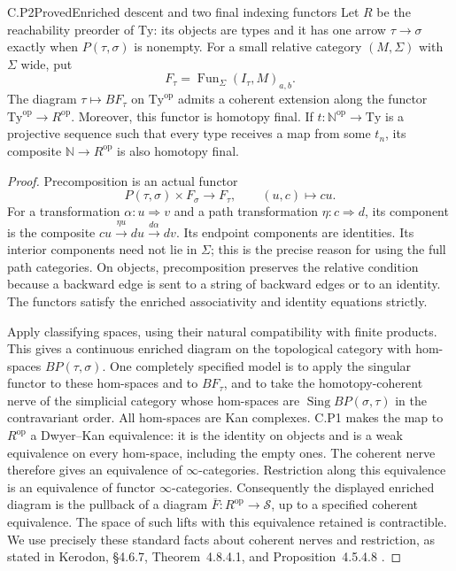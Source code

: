 \begin{result}{C.P2}{Proved}{Enriched descent and two final indexing functors}
Let $R$ be the reachability preorder of $\mathrm{Ty}$: its objects are types and it has one arrow $\tau\to\sigma$ exactly when $P(\tau,\sigma)$ is nonempty. For a small relative category $(M,\Sigma)$ with $\Sigma$ wide, put
\[
 F_\tau=\operatorname{Fun}_{\Sigma}(I_\tau,M)_{a,b}.
\]
The diagram $\tau\mapsto BF_\tau$ on $\mathrm{Ty}^{\mathrm{op}}$ admits a coherent extension along the functor
$\mathrm{Ty}^{\mathrm{op}}\to R^{\mathrm{op}}$. Moreover, this functor is homotopy final. If $t:\mathbb N^{\mathrm{op}}\to\mathrm{Ty}$ is a projective sequence such that every type receives a map from some $t_n$, its composite $\mathbb N\to R^{\mathrm{op}}$ is also homotopy final.
\end{result}
\begin{proof}
Precomposition is an actual functor
\[
 P(\tau,\sigma)\times F_\sigma\longrightarrow F_\tau,
 \qquad (u,c)\longmapsto c u.
\]
For a transformation $\alpha:u\Rightarrow v$ and a path transformation $\eta:c\Rightarrow d$, its component is the composite
$c u\xrightarrow{\eta u}d u\xrightarrow{d\alpha}d v$.
Its endpoint components are identities. Its interior components need not lie in $\Sigma$; this is the precise reason for using the full path categories. On objects, precomposition preserves the relative condition because a backward edge is sent to a string of backward edges or to an identity. The functors satisfy the enriched associativity and identity equations strictly.

Apply classifying spaces, using their natural compatibility with finite products. This gives a continuous enriched diagram on the topological category with hom-spaces $BP(\tau,\sigma)$. One completely specified model is to apply the singular functor to these hom-spaces and to $BF_\tau$, and to take the homotopy-coherent nerve of the simplicial category whose hom-spaces are $\operatorname{Sing}BP(\sigma,\tau)$ in the contravariant order. All hom-spaces are Kan complexes. C.P1 makes the map to $R^{\mathrm{op}}$ a Dwyer--Kan equivalence: it is the identity on objects and is a weak equivalence on every hom-space, including the empty ones. The coherent nerve therefore gives an equivalence of $\infty$-categories. Restriction along this equivalence is an equivalence of functor $\infty$-categories. Consequently the displayed enriched diagram is the pullback of a diagram $\overline F:R^{\mathrm{op}}\to\mathcal S$, up to a specified coherent equivalence. The space of such lifts with this equivalence retained is contractible. We use precisely these standard facts about coherent nerves and restriction, as stated in Kerodon, \S4.6.7, Theorem~4.8.4.1, and Proposition~4.5.4.8 \citep{ALurie2026}.


\end{proof}
